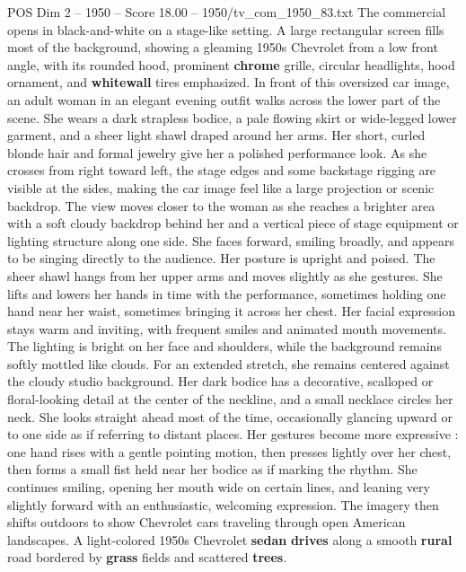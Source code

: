 \begin{textsample}{POS Dim 2 – 1950 – Score 18.00 – 1950/tv\_com\_1950\_83.txt}  \label{ex:f2_pos_082}
The commercial opens in black-and-white on a stage-like setting.
A large rectangular screen fills most of the background, showing a gleaming 1950s Chevrolet from a low front angle, with its rounded hood, prominent \textbf{chrome} grille, circular headlights, hood ornament, and \textbf{whitewall} tires emphasized.
In front of this oversized car image, an adult woman in an elegant evening outfit walks across the lower part of the scene.
She wears a dark strapless bodice, a pale flowing skirt or wide-legged lower garment, and a sheer light shawl draped around her arms.
Her short, curled blonde hair and formal jewelry give her a polished performance look.
As she crosses from right toward left, the stage edges and some backstage rigging are visible at the sides, making the car image feel like a large projection or scenic backdrop.
The view moves closer to the woman as she reaches a brighter area with a soft cloudy backdrop behind her and a vertical piece of stage equipment or lighting structure along one side.
She faces forward, smiling broadly, and appears to be singing directly to the audience.
Her posture is upright and poised.
The sheer shawl hangs from her upper arms and moves slightly as she gestures.
She lifts and lowers her hands in time with the performance, sometimes holding one hand near her waist, sometimes bringing it across her chest.
Her facial expression stays warm and inviting, with frequent smiles and animated mouth movements.
The lighting is bright on her face and shoulders, while the background remains softly mottled like clouds.
For an extended stretch, she remains centered against the cloudy studio background.
Her dark bodice has a decorative, scalloped or floral-looking detail at the center of the neckline, and a small necklace circles her neck.
She looks straight ahead most of the time, occasionally glancing upward or to one side as if referring to distant places.
Her gestures become more expressive : one hand rises with a gentle pointing motion, then presses lightly over her chest, then forms a small fist held near her bodice as if marking the rhythm.
She continues smiling, opening her mouth wide on certain lines, and leaning very slightly forward with an enthusiastic, welcoming expression.
The imagery then shifts outdoors to show Chevrolet cars traveling through open American landscapes.
A light-colored 1950s Chevrolet \textbf{sedan} \textbf{drives} along a smooth \textbf{rural} road bordered by \textbf{grass} fields and scattered \textbf{trees}.

\end{textsample}
